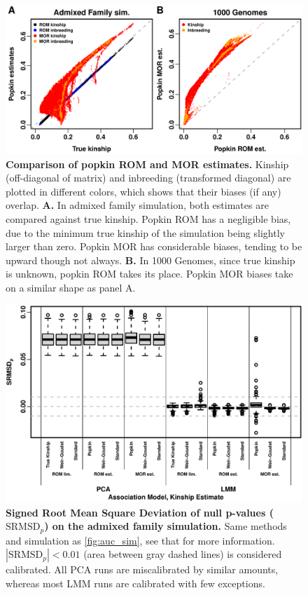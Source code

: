 \documentclass[11pt]{article}
\newcommand{\rmsd}{\text{SRMSD}_p}
\begin{document}
\begin{figure}[hp!]
  \centering
  \includegraphics[width=\textwidth]{popkin-mor-rom-bias.png}
  \caption{
    {\bf Comparison of popkin ROM and MOR estimates.}
    Kinship (off-diagonal of matrix) and inbreeding (transformed diagonal) are plotted in different colors, which shows that their biases (if any) overlap.
    \textbf{A.}
    In admixed family simulation, both estimates are compared against true kinship.
    Popkin ROM has a negligible bias, due to the minimum true kinship of the simulation being slightly larger than zero.
    Popkin MOR has considerable biases, tending to be upward though not always.
    \textbf{B.}
    In 1000 Genomes, since true kinship is unknown, popkin ROM takes its place.
    Popkin MOR biases take on a similar shape as panel A.
    }
  \label{fig:popkin-rom-mor}
\end{figure}

\begin{figure}[hp!]
  \centering
  \includegraphics[width=\textwidth]{sim-admix-n1000-m100000-k3-f0.3-s0.5-mc100-h0.8-g20-fes/rmsd.pdf}
  \caption{
    {\bf Signed Root Mean Square Deviation of null p-values ($\rmsd$) on the admixed family simulation.}
    Same methods and simulation as \cref{fig:auc_sim}, see that for more information.
    $|\rmsd| < 0.01$ (area between gray dashed lines) is considered calibrated.
    All PCA runs are miscalibrated by similar amounts, whereas most LMM runs are calibrated with few exceptions.
    }
  \label{fig:rmsd_sim}
\end{figure}
\end{document}
